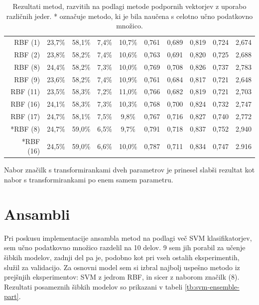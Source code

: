 \documentclass[11pt,a4paper,openany]{book}
\begin{document}
\begin{table}[h!]
\begin{tabular}{r|cccc|cccc|c}
		RBF (1) & 23,7\% & 58,1\% & 7,4\% & 10,7\% &
		0,761 & 0,689 & 0,819 & 0,724 &
		2,674 \\								
		RBF (2) & 23,8\% & 58,2\% & 7,4\% & 10,6\% &
		0,763 & 0,691 & 0,820 & 0,725 &
		2,688 \\
		RBF (8) & 24,4\% & 58,2\% & 7,3\% & 10,0\% &
		0,769 & 0,708 & 0,826 & 0,737 &
		2,783 \\			
		RBF (9) & 23,6\% & 58,2\% & 7,4\% & 10,9\% &
		0,761 & 0,684 & 0,817 & 0,721 &
		2,648 \\
		RBF (11) & 23,5\% & 58,3\% & 7,2\% & 11,0\% &
		0,766 & 0,682 & 0,819 & 0,721 &
		2,703 \\
		RBF (16) & 24,1\% & 58,3\% & 7,3\% & 10,3\% &
		0,768 & 0,700 & 0,824 & 0,732 &
		2,747 \\
		RBF (17) & 24,7\% & 58,1\% & 7,5\% & 9,8\% &
		0,767 & 0,716 & 0,827 & 0,740 &
		2,772 \\
		
		\hline
		*RBF (8) & 24,7\% & 59,0\% & 6,5\% & 9,7\% &
		0,791 & 0,718 & 0,837 & 0,752 &
		2,940 \\
		*RBF (16) & 24,5\% & 59,0\% & 6,6\% & 10,0\% &
		0,787 & 0,711 & 0,834 & 0,747 &
		2.916 \\
		
		
	\end{tabular}
	\caption{Rezultati metod, razvitih na podlagi metode podpornih vektorjev z uporabo različnih jeder. * označuje metodo, ki je bila naučena s celotno učno podatkovno množico.}
	\label{tb:svm_kernel}
\end{table}

Nabor značilk s transformirankami dveh parametrov je prinesel slabši rezultat kot nabor s transformirankami po enem samem parametru.

\section{Ansambli}

Pri poskusu implementacije ansambla metod na podlagi več SVM klasifikatorjev, sem učno podatkovno množico razdelil na 10 delov. 9 sem jih porabil za učenje šibkih modelov, zadnji del pa je, podobno kot pri vseh ostalih eksperimentih, služil za validacijo. Za osnovni model sem si izbral najbolj uspešno metodo iz prejšnjih eksperimentov: SVM z jedrom RBF, in sicer z naborom značilk (8). Rezultati posameznih šibkih modelov so prikazani v tabeli \ref{tb:svm-ensemble-part}.
\end{document}
